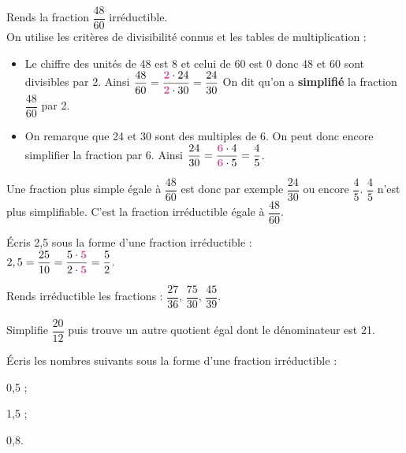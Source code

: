 \begin{methode*1}

\begin{exemple*1}
Rends la fraction $\dfrac{48}{60}$ irréductible. \\[1em]
On utilise les critères de divisibilité connus et les tables de multiplication :
\begin{itemize}
 \item Le chiffre des unités de 48 est 8 et celui de 60 est 0 donc 48 et 60 sont divisibles par 2. 
Ainsi $\dfrac{48}{60} = \dfrac{\text{\textbf{\textcolor{C2}{2}}} \cdot 24}{\text{\textbf{\textcolor{C2}{2}}} \cdot 30} = \dfrac{24}{30}$ On dit qu'on a \textbf{simplifié} la fraction $\dfrac{48}{60}$ par 2.
 \item On remarque que 24 et 30 sont des multiples de 6. On peut donc encore simplifier la fraction par 6.
 Ainsi $\dfrac{24}{30} = \dfrac{\text{\textbf{\textcolor{C2}{6}}} \cdot 4}{\text{\textbf{\textcolor{C2}{6}}} \cdot 5} = \dfrac{4}{5}$.
 \end{itemize}
Une fraction plus simple égale à $\dfrac{48}{60}$ est donc par exemple $\dfrac{24}{30}$ ou encore $\dfrac{4}{5}$.
$\dfrac{4}{5}$ n'est plus simplifiable. C'est la fraction irréductible égale à $\dfrac{48}{60}$.
 \end{exemple*1}
 
\begin{exemple*1}
Écris 2,5 sous la forme d'une fraction irréductible : \\[1em]
$2,5 = \dfrac{25}{10} = \dfrac{5 \cdot \text{\textbf{\textcolor{C2}{5}}}}{2 \cdot \text{\textbf{\textcolor{C2}{5}}}} = \dfrac{5}{2}$.
 \end{exemple*1}
 
 
  \exercice
Rends irréductible les fractions : $\dfrac{27}{36}$, $\dfrac{75}{30}$, $\dfrac{45}{39}$.

  \exercice
Simplifie $\dfrac{20}{12}$ puis trouve un autre quotient égal dont le dénominateur est 21.

  \exercice
Écris les nombres suivants sous la forme d'une fraction irréductible :
\begin{colenumerate}{3}
 \item 0,5 ;
 \item 1,5 ;
 \item 0,8.
 \end{colenumerate}

 \end{methode*1}

